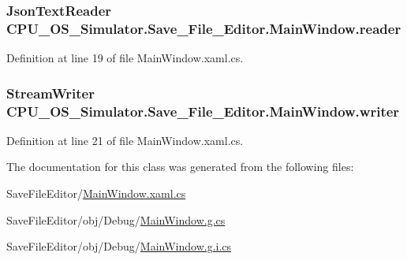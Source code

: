 \subsubsection[{reader}]{\setlength{\rightskip}{0pt plus 5cm}Json\+Text\+Reader C\+P\+U\+\_\+\+O\+S\+\_\+\+Simulator.\+Save\+\_\+\+File\+\_\+\+Editor.\+Main\+Window.\+reader\hspace{0.3cm}{\ttfamily [private]}}\label{class_c_p_u___o_s___simulator_1_1_save___file___editor_1_1_main_window_a1656475bf9628e4335781cf30a84d93e}


Definition at line 19 of file Main\+Window.\+xaml.\+cs.

\hypertarget{class_c_p_u___o_s___simulator_1_1_save___file___editor_1_1_main_window_afe228202821ede30538aebda6142f8da}{}
\subsubsection[{writer}]{\setlength{\rightskip}{0pt plus 5cm}Stream\+Writer C\+P\+U\+\_\+\+O\+S\+\_\+\+Simulator.\+Save\+\_\+\+File\+\_\+\+Editor.\+Main\+Window.\+writer\hspace{0.3cm}{\ttfamily [private]}}\label{class_c_p_u___o_s___simulator_1_1_save___file___editor_1_1_main_window_afe228202821ede30538aebda6142f8da}


Definition at line 21 of file Main\+Window.\+xaml.\+cs.



The documentation for this class was generated from the following files\+:\begin{DoxyCompactItemize}
\item 
Save\+File\+Editor/\hyperlink{_save_file_editor_2_main_window_8xaml_8cs}{Main\+Window.\+xaml.\+cs}\item 
Save\+File\+Editor/obj/\+Debug/\hyperlink{_save_file_editor_2obj_2_debug_2_main_window_8g_8cs}{Main\+Window.\+g.\+cs}\item 
Save\+File\+Editor/obj/\+Debug/\hyperlink{_save_file_editor_2obj_2_debug_2_main_window_8g_8i_8cs}{Main\+Window.\+g.\+i.\+cs}\end{DoxyCompactItemize}
